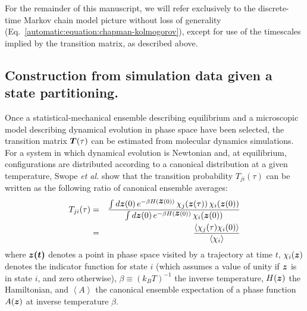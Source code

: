 For the remainder of this manuscript, we will refer exclusively to the discrete-time Markov chain model picture without loss of generality (Eq.\ \ref{automatic:equation:chapman-kolmogorov}), except for use of the timescales implied by the transition matrix, as described above.

\subsection{Construction from simulation data given a state partitioning.}
\label{automatic:section:theory:construction-from-simulation-data}

Once a statistical-mechanical ensemble describing equilibrium and a microscopic model describing dynamical evolution in phase space have been selected, the transition matrix ${\mbox{\boldmath{$T$}}}(\tau)$ can be estimated from molecular dynamics simulations.
For a system in which dynamical evolution is Newtonian and, at equilibrium, configurations are distributed according to a canonical distribution at a given temperature, Swope \emph{et al.}\cite{swope:2004a} show that the transition probability $T_{ji}(\tau)$ can be written as the following ratio of canonical ensemble averages:
\begin{eqnarray}
T_{ji}(\tau) 
&=& \frac{\int d{\mbox{\boldmath{$z$}}}(0) \, e^{-\beta H({\mbox{\boldmath{$z$}}}(0))} \, \chi_j({\mbox{\boldmath{$z$}}}(\tau)) \, \chi_i({\mbox{\boldmath{$z$}}}(0))}{\int d{\mbox{\boldmath{$z$}}}(0) \, e^{-\beta H({\mbox{\boldmath{$z$}}}(0))} \, \chi_i({\mbox{\boldmath{$z$}}}(0))} \label{automatic:equation:transition-element-phase-space-integrals} \\
&=& \frac{\langle \chi_j(\tau) \chi_i(0) \rangle}{\langle \chi_i \rangle} \label{automatic:equation:transition-element-correlation-functions}
\end{eqnarray}
where ${\mbox{\boldmath{$z(t)$}}}$ denotes a point in phase space visited by a trajectory at time $t$, 
$\chi_i({\mbox{\boldmath{$z$}}})$ denotes the indicator function for state $i$ (which assumes a value of unity if ${\mbox{\boldmath{$z$}}}$ is in state $i$, and zero otherwise),
$\beta \equiv (k_B T)^{-1}$ the inverse temperature, $H({\mbox{\boldmath{$z$}}})$ the Hamiltonian, and $\left< A \right>$ the canonical ensemble expectation of a phase function $A({\mbox{\boldmath{$z$}}})$ at inverse temperature $\beta$.

